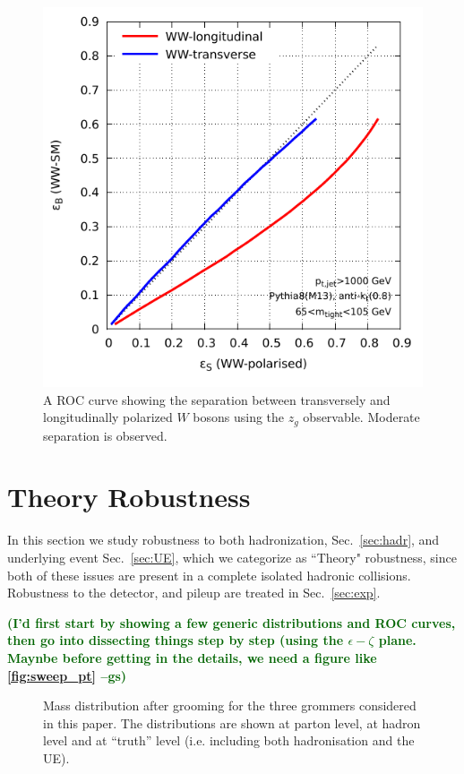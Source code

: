 \documentclass[11pt,letterpaper]{article}
\DeclareRobustCommand{\Sec}[1]{Sec.~\ref{#1}}
\newcommand{\gs}[1]{\textbf{\textcolor{darkgreen}{(#1 --gs)}}}
\begin{document}
\begin{figure}
\begin{center}
\includegraphics[width=0.45\columnwidth]{figures/polarisation-zg-roc}
\end{center}
\caption{A ROC curve showing the separation between transversely and longitudinally polarized $W$ bosons using the $z_g$ observable. Moderate separation is observed.}
\label{fig:z_g_ROC}
\end{figure}



\section{Theory Robustness}\label{sec:np}


In this section we study robustness to both hadronization, \Sec{sec:hadr}, and underlying event \Sec{sec:UE}, which we categorize as ``Theory" robustness, since both of these issues are present in a complete isolated hadronic collisions. Robustness to the detector, and pileup are treated in \Sec{sec:exp}. 


\gs{I'd first start by showing a few generic distributions and ROC
  curves, then go into dissecting things step by step (using the
  $\epsilon-\zeta$ plane. Maynbe before getting in the details, we
  need a figure like \ref{fig:sweep_pt}}

\begin{figure}
  \caption{Mass distribution after grooming for the three grommers
    considered in this paper. The distributions are shown at parton
    level, at hadron level and at ``truth'' level (i.e. including both
    hadronisation and the UE).}\label{fig:mass-distribution}
\end{figure}
\end{document}
